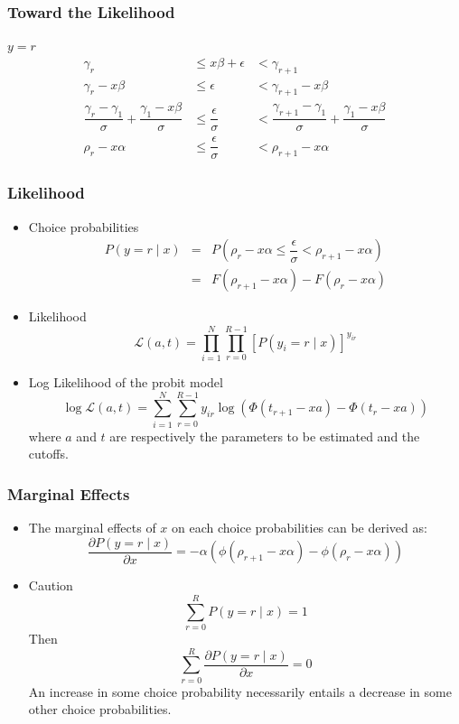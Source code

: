 \documentclass{beamer}
\newcommand{\Lik}{\mathcal{L}}
\newcommand{\1}{\mathbb{1}}
\begin{document}
\begin{frame}\frametitle{Toward the Likelihood}
$y=r$
\begin{eqnarray*}
  \gamma_r   &\leq x\beta + \epsilon & < \gamma_{r+1} \\
  \gamma_r - x\beta & \leq \epsilon & < \gamma_{r+1} -x\beta\\
   \dfrac{\gamma_r-\gamma_1}{\sigma} + \dfrac{\gamma_1- x\beta}{\sigma} & \leq \dfrac{\epsilon}{\sigma} & < \dfrac{\gamma_{r+1}-\gamma_1}{\sigma} + \dfrac{\gamma_1-x\beta}{\sigma}\\
     \rho_r - x\alpha  & \leq \dfrac{\epsilon}{\sigma} & < \rho_{r+1} - x\alpha
\end{eqnarray*}
\end{frame}

\begin{frame}\frametitle{Likelihood}
\begin{itemize}
 \item Choice probabilities
\begin{eqnarray*}
   P(y=r \mid x) &=& P(\rho_r - x\alpha\leq \dfrac{\epsilon}{\sigma}  < \rho_{r+1} - x\alpha)\\
        &=& F(\rho_{r+1} - x\alpha) - F(\rho_{r} - x\alpha)
\end{eqnarray*}
\item Likelihood 
\begin{equation}
 \Lik(a,t) = \prod_{i=1}^{N} \prod_{r=0}^{R-1} [P(y_i=r \mid x)]^{y_{ir}}
\end{equation}
\item Log Likelihood of the probit model
\begin{equation}
\log \Lik(a,t) = \sum_{i=1}^{N} \sum_{r=0}^{R-1} y_{ir} \log (\Phi(t_{r+1} - x a) - \Phi(t_{r} - x a))
\end{equation}
where $a$ and $t$ are respectively the parameters to be estimated and the cutoffs. 
\end{itemize}
\end{frame}

\begin{frame}\frametitle{Marginal Effects}
\begin{itemize}
 \item The marginal effects of $x$ on each choice probabilities can be derived as:
\begin{equation}
 \dfrac{\partial P(y=r \mid x)}{\partial x} = -\alpha (\phi(\rho_{r+1} - x\alpha) - \phi(\rho_{r} - x\alpha))
\end{equation}
\item Caution
\begin{equation}
 \sum_{r=0}^{R} P(y=r \mid x)=1 
\end{equation}
Then 
\begin{equation}
 \sum_{r=0}^{R} \dfrac{\partial P(y=r \mid x)}{\partial x} = 0
\end{equation}
An increase in some choice probability necessarily entails a decrease in some other choice probabilities. 
\end{itemize}



\end{frame}
\end{document}
